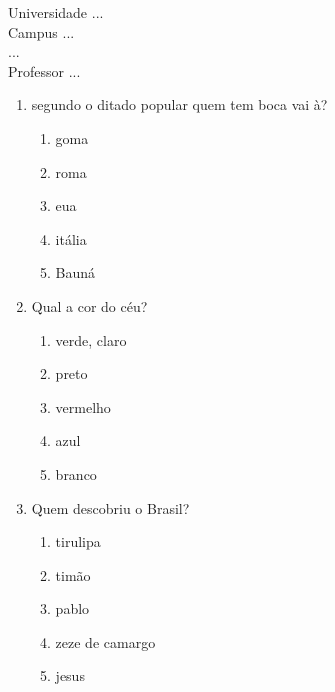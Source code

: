 \documentclass[10pt,a4paper,twocolumn]{report}
\begin{document}
\begin{flushleft}
Universidade ...\\
Campus ...\\
...\\
Professor ...\\
\end{flushleft}




 \begin{enumerate} 
    \item  segundo o ditado popular quem tem boca vai à?





    \begin{enumerate}
    \item  goma

\item  roma

\item  eua

\item  itália

\item  Bauná


    \end{enumerate} 
    \item  Qual a cor do céu?





    \begin{enumerate}
    \item  verde, claro

\item  preto

\item  vermelho

\item  azul

\item  branco


    \end{enumerate} 
    \item  Quem descobriu o Brasil?





    \begin{enumerate}
    \item  tirulipa

\item  timão

\item  pablo

\item  zeze de camargo

\item  jesus


    \end{enumerate}\end{enumerate} 
\end{document}
